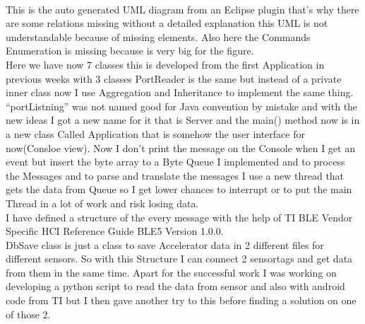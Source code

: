 \documentclass[12pt]{article}
\begin{document}
\\This is the auto generated UML diagram from an Eclipse plugin that's why there are some relations missing without a detailed explanation this UML is not understandable because of missing elements.
Also here the Commands Enumeration is missing because is very big for the figure.\\
Here we have now 7 classes this is developed from the first Application in previous weeks with 3 classes PortReader is the same but instead of a private inner class now I use Aggregation and Inheritance to implement the same thing. “portListning” was not named good for Java convention by mistake and with the new ideas I got a new name for it that is Server and the main() method now is in a new class Called Application that is somehow the user interface for now(Consloe view).
Now I don’t print the message on the Console when I get an event but insert the byte array to a Byte Queue I implemented and to process the Messages and to parse and translate the messages I use a new thread that gets the data from Queue so I get lower chances to interrupt or to put the main Thread  in a lot of work and risk losing data.\\
I have defined a structure of the every message with the help of TI BLE Vendor Specific HCI Reference Guide BLE5 Version 1.0.0.\\
DbSave class is just a class to save Accelerator data in 2 different files for different sensors.
So with this Structure I can connect 2 sensortags and get data from them in the same time.
Apart for the successful work I was working on developing a python script to read the data from sensor and also with android code from TI but I then gave another try to this before finding a solution on one of those 2.\\
\end{document}
